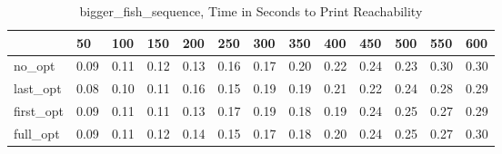 \begin{table}
\caption{bigger\_fish\_sequence, Time in Seconds to Print Reachability}
\label{bigger_fish_sequence_states_time}
\begin{tabular}{lllllllllllll}
\toprule
 & 50 & 100 & 150 & 200 & 250 & 300 & 350 & 400 & 450 & 500 & 550 & 600 \\
\midrule
no\_opt & 0.09 & 0.11 & 0.12 & 0.13 & 0.16 & 0.17 & 0.20 & 0.22 & 0.24 & 0.23 & 0.30 & 0.30 \\
last\_opt & 0.08 & 0.10 & 0.11 & 0.16 & 0.15 & 0.19 & 0.19 & 0.21 & 0.22 & 0.24 & 0.28 & 0.29 \\
first\_opt & 0.09 & 0.11 & 0.11 & 0.13 & 0.17 & 0.19 & 0.18 & 0.19 & 0.24 & 0.25 & 0.27 & 0.29 \\
full\_opt & 0.09 & 0.11 & 0.12 & 0.14 & 0.15 & 0.17 & 0.18 & 0.20 & 0.24 & 0.25 & 0.27 & 0.30 \\
\bottomrule
\end{tabular}
\end{table}
